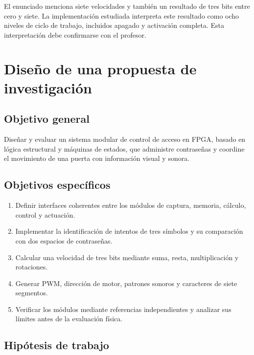 \documentclass[12pt,letterpaper]{article}
\begin{document}
El enunciado menciona siete velocidades y también un
resultado de tres bits entre cero y siete. La
implementación estudiada interpreta este resultado como
ocho niveles de ciclo de trabajo, incluidos apagado y
activación completa. Esta interpretación debe confirmarse
con el profesor.


\section{Diseño de una propuesta de investigación}

\subsection{Objetivo general}

Diseñar y evaluar un sistema modular de control de acceso
en FPGA, basado en lógica estructural y máquinas de
estados, que administre contraseñas y coordine el
movimiento de una puerta con información visual y sonora.

\subsection{Objetivos específicos}

\begin{enumerate}
    \item Definir interfaces coherentes entre los módulos
    de captura, memoria, cálculo, control y actuación.
    \item Implementar la identificación de intentos de
    tres símbolos y su comparación con dos espacios
    de contraseñas.
    \item Calcular una velocidad de tres bits mediante
    suma, resta, multiplicación y rotaciones.
    \item Generar PWM, dirección de motor, patrones
    sonoros y caracteres de siete segmentos.
    \item Verificar los módulos mediante referencias
    independientes y analizar sus límites antes de
    la evaluación física.
\end{enumerate}

\subsection{Hipótesis de trabajo}
\end{document}
